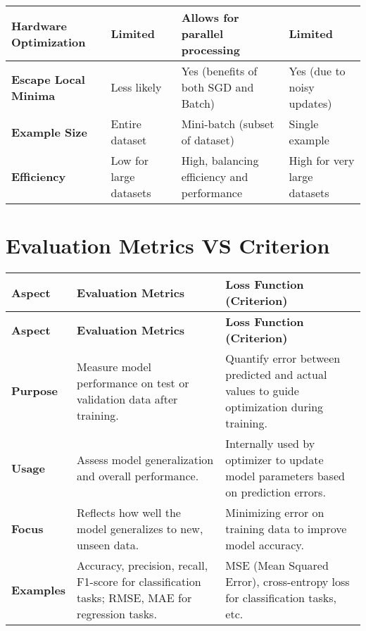 \begin{longtable}{|p{2.5cm}|p{4cm}|p{3.5cm}|p{3.5cm}|}
    \textbf{Hardware Optimization} & Limited & Allows for parallel processing & Limited \\
    \hline
    
    \textbf{Escape Local Minima} & Less likely & Yes (benefits of both SGD and Batch) & Yes (due to noisy updates) \\
    \hline
    
    \textbf{Example Size} & Entire dataset & Mini-batch (subset of dataset) & Single example \\
    \hline
    
    \textbf{Efficiency} & Low for large datasets & High, balancing efficiency and performance & High for very large datasets \\
    \hline

\end{longtable}


\section{Evaluation Metrics VS Criterion}\label{Evaluation Metrics VS Criterion}

\begin{longtable}{|p{2cm}|p{6cm}|p{6cm}|}
    \hline
    \textbf{Aspect} & \textbf{Evaluation Metrics} & \textbf{Loss Function (Criterion)} \\
    \hline
    \endfirsthead

    \hline
    \textbf{Aspect} & \textbf{Evaluation Metrics} & \textbf{Loss Function (Criterion)} \\
    \hline\endhead
    
    \hline\endfoot
    \hline\endlastfoot
    
    \textbf{Purpose} & Measure model performance on test or validation data after training. & Quantify error between predicted and actual values to guide optimization during training. \\
    \hline
    
    \textbf{Usage} & Assess model generalization and overall performance. & Internally used by optimizer to update model parameters based on prediction errors. \\
    \hline
    
    \textbf{Focus} & Reflects how well the model generalizes to new, unseen data. & Minimizing error on training data to improve model accuracy. \\
    \hline

    \textbf{Examples} & Accuracy, precision, recall, F1-score for classification tasks; RMSE, MAE for regression tasks. & MSE (Mean Squared Error), cross-entropy loss for classification tasks, etc. \\
    \hline
\end{longtable}

